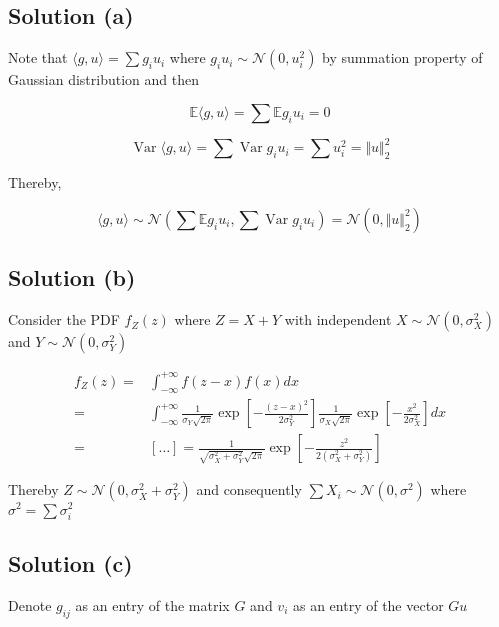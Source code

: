\documentclass{article}
\DeclareMathOperator{\Var}{Var}
\begin{document}
\subsection{Solution (a)}

Note that $\langle g, u \rangle = \sum g_iu_i$ where $g_iu_i \sim \mathcal N (0, u_i^2)$ by summation property of Gaussian distribution and then

$$\mathbb E \langle g, u \rangle = \sum \mathbb E g_iu_i = 0$$

$$\Var \langle g, u \rangle = \sum \Var g_iu_i = \sum u_i^2 = \Vert u \Vert^2_2$$

Thereby, 

$$\langle g, u \rangle \sim \mathcal N \left(\sum \mathbb E g_iu_i, \sum \Var g_iu_i \right) = \mathcal N(0, \Vert u \Vert^2_2)$$

\subsection{Solution (b)}

Consider the PDF $f_Z(z)$ where $Z = X + Y$ with independent $X \sim \mathcal N(0, \sigma_X^2)$ and $Y \sim \mathcal N(0, \sigma_Y^2)$

\begin{equation*}
    \begin{aligned}
        f_Z(z) = & \int_{-\infty}^{+\infty} f(z-x)f(x)dx \\
        = & \int_{-\infty}^{+\infty} \frac{1}{\sigma_Y\sqrt{2 \pi}} \exp \left[ -\frac{(z - x)^2}{2 \sigma_Y^2} \right] \frac{1}{\sigma_X\sqrt{2 \pi}} \exp \left[ -\frac{x^2}{2 \sigma_X^2} \right] dx \\
        = & [\dots] = \frac{1}{\sqrt{\sigma_X^2 + \sigma_Y^2}\sqrt{2 \pi}} \exp \left[ -\frac{z^2}{2 (\sigma_X^2 + \sigma_Y^2)} \right]
    \end{aligned}
\end{equation*}

Thereby $Z \sim \mathcal N(0, \sigma_X^2 + \sigma_Y^2)$ and consequently $\sum X_i \sim \mathcal N(0, \sigma^2)$ where $\sigma^2 = \sum \sigma_i^2$

\subsection{Solution (c)}

Denote $g_{ij}$ as an entry of the matrix $G$ and $v_i$ as an entry of the vector $Gu$
\end{document}
